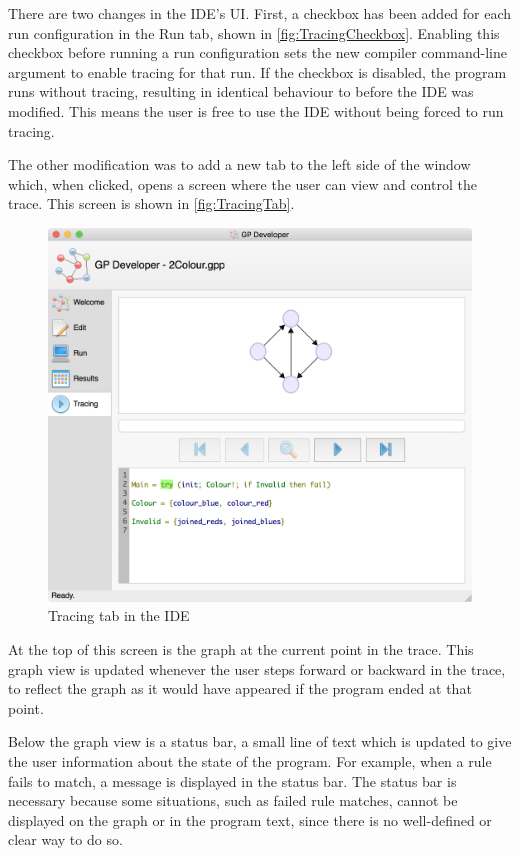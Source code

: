 \documentclass[authoryearcitations]{UoYCSproject}
\newenvironment{nscenter}
    {\parskip=0pt\par\nopagebreak\centering}
    {\par\noindent\ignorespacesafterend}
\begin{document}
There are two changes in the IDE's UI. First, a checkbox has been added for each
run configuration in the Run tab, shown in \autoref{fig:TracingCheckbox}. Enabling
this checkbox before running a run configuration sets the new compiler command-line
argument to enable tracing for that run. If the checkbox is disabled, the program
runs without tracing, resulting in identical behaviour to before the IDE was
modified. This means the user is free to use the IDE without being forced to run
tracing.

The other modification was to add a new tab to the left side of the window
which, when clicked, opens a screen where the user can view and control the trace.
This screen is shown in \autoref{fig:TracingTab}.

\begin{figure}[!htb]
    \begin{nscenter}
        \includegraphics[width=\textwidth]{TracingTab}
    \end{nscenter}
    \caption{Tracing tab in the IDE}
    \label{fig:TracingTab}
\end{figure}

At the top of this screen is the graph at the current point in the trace. This
graph view is updated whenever the user steps forward or backward in the trace,
to reflect the graph as it would have appeared if the program ended at that point.

Below the graph view is a status bar, a small line of text which is updated to
give the user information about the state of the program. For example, when a rule
fails to match, a message is displayed in the status bar. The status bar is necessary
because some situations, such as failed rule matches, cannot be displayed on the graph
or in the program text, since there is no well-defined or clear way to do so.
\end{document}
